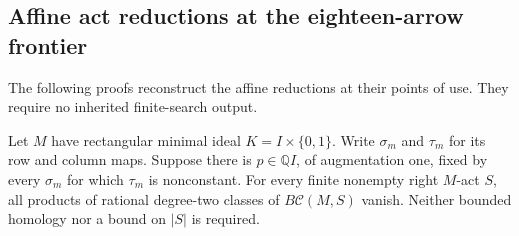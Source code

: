 \subsection{Affine act reductions at the eighteen-arrow frontier}

The following proofs reconstruct the affine reductions at their
points of use. They require no inherited finite-search output.

\begin{lemma}
\label{CP2:A-act-common-affine-origin}
Let $M$ have rectangular minimal ideal $K=I\times\{0,1\}$.
Write $\sigma_m$ and $\tau_m$ for its row and column maps.
Suppose there is $p\in\mathbb QI$, of augmentation one,
fixed by every $\sigma_m$ for which $\tau_m$ is nonconstant.
For every finite nonempty right $M$-act $S$, all products
of rational degree-two classes of $B\mathcal C(M,S)$ vanish.
Neither bounded homology nor a bound on $|S|$ is required.
\end{lemma}
